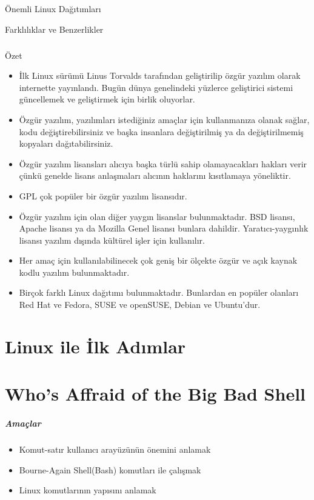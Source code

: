 \documentclass[10pt,a5paper]{book}
\begin{document}
\begin{section}{Önemli Linux Dağıtımları}
\begin{subsection}{Farklılıklar ve Benzerlikler}
\paragraph{}{Özet}
\begin{itemize}
 \item İlk Linux sürümü Linus Torvalds tarafından geliştirilip özgür yazılım olarak internette yayınlandı. Bugün dünya genelindeki yüzlerce geliştirici sistemi güncellemek ve geliştirmek için birlik oluyorlar.
 \item Özgür yazılım, yazılımları istediğiniz amaçlar için kullanmanıza olanak sağlar, kodu değiştirebilirsiniz ve başka insanlara değiştirilmiş ya da değiştirilmemiş kopyaları dağıtabilirsiniz.
 \item Özgür yazılım lisansları alıcıya başka türlü sahip olamayacakları hakları verir çünkü genelde lisans anlaşmaları alıcının haklarını kısıtlamaya yöneliktir.
 \item GPL çok popüler bir özgür yazılım lisansıdır.
 \item Özgür yazılım için olan diğer yaygın lisanslar bulunmaktadır. BSD lisansı, Apache lisansı ya da Mozilla Genel lisansı bunlara dahildir. Yaratıcı-yaygınlık lisansı yazılım dışında kültürel işler için kullanılır.
 \item Her amaç için kullanılabilinecek çok geniş bir ölçekte özgür ve açık kaynak kodlu yazılım bulunmaktadır.
 \item Birçok farklı Linux dağıtımı bulunmaktadır. Bunlardan en popüler olanları Red Hat ve Fedora, SUSE ve openSUSE, Debian ve Ubuntu'dur.
\end{itemize}
\end{subsection}
\end{section}
\chapter{Linux ile İlk Adımlar}


\chapter{Who's Affraid of the Big Bad Shell}
\paragraph{Amaçlar}
\begin{itemize}
 \item Komut-satır kullanıcı arayüzünün önemini anlamak
 \item Bourne-Again Shell(Bash) komutları ile çalışmak
 \item Linux komutlarının yapısını anlamak
 \end{itemize}
 
\end{document}
